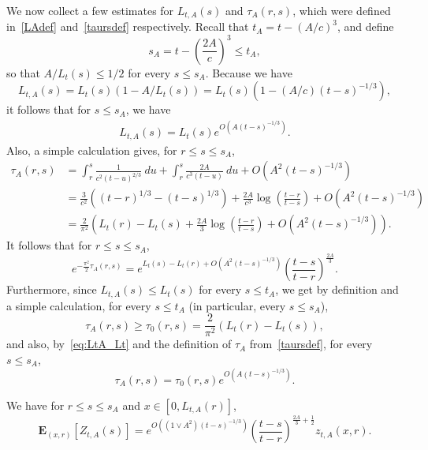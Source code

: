 \documentclass[AHL,Unicode,longabstracts,published]{cedram}
\newcommand*\E{\mathbf{E}}
\newcommand{\1} {\mathds{1}}
\begin{document}
We now collect a few estimates for $L_{t,A}(s)$ and $\tau_A(r,s)$, which were defined in~\eqref{LAdef} and~\eqref{taursdef} respectively. Recall that $t_A = t - (A/c)^3$, and define
\[
s_A = t - \left(\frac{2A}{c}\right)^3 \le t_A,
\]
so that $A/L_t(s) \le 1/2$ for every $s\le s_A$. Because we have
\[
L_{t,A}(s) = L_t(s)(1 - A/L_t(s)) = L_t(s)\left(1 - (A/c)(t - s)^{-1/3}\right),
\]
it follows that for $s\le s_A$, we have
\begin{align}\label{eq:LtA_Lt}
L_{t,A}(s) = L_t(s)e^{O\left(A(t-s)^{-1/3}\right)}.
\end{align}
Also, a simple calculation gives, for $r\le s\le s_A$,
\begin{equation}\label{tauasym}
\begin{split}
\tau_A(r, s) &= \int_r^s \frac{1}{c^2 (t - u)^{2/3}} \: du + \int_r^s \frac{2A}{c^3 (t - u)} \: du + O\left(A^2(t - s)^{-1/3}\right) \\
&= \frac{3}{c^2} \left((t - r)^{1/3} - (t - s)^{1/3} \right) + \frac{2A}{c^3} \log \left(\frac{t - r}{t-s} \right) + O\left(A^2(t - s)^{-1/3}\right)\\
&= \frac 2 {\pi^2} \left(L_t(r) - L_t(s) + \frac {2 A}{3} \log \left(\frac{t - r}{t-s} \right) + O\left(A^2(t - s)^{-1/3}\right)\right).
\end{split}
\end{equation}
It follows that for $r\le s\le s_A$,
\begin{equation}\label{tauLexpasym}
e^{-\frac{\pi^2}2\tau_A(r,s)} = e^{L_t(s) - L_t(r) + O\left(A^2(t - s)^{-1/3}\right)} \left(\frac{t - s}{t-r} \right)^{\frac{2A} 3}.
\end{equation}
Furthermore, since $L_{t,A}(s) \le L_t(s)$ for every $s\le t_A$, we get by definition and a simple calculation, for every $s\le t_A$ (in particular, every $s\le s_A$),
\begin{equation}\label{taucomparison}
\tau_A(r,s) \ge \tau_0(r,s) = \frac 2 {\pi^2} \left(L_t(r) - L_t(s)\right),
\end{equation}
and also, by~\eqref{eq:LtA_Lt} and the definition of $\tau_A$ from~\eqref{taursdef}, for every $s\le s_A$,
\begin{equation}\label{taucomparisonweak}
\tau_A(r,s) = \tau_0(r,s)e^{O\left(A(t-s)^{-1/3}\right)}.
\end{equation}

\begin{lemm}
We have for $r\le s\le s_A$ and $x\in [0,L_{t,A}(r)]$,\label{lem:Zexp}
\[
\E_{(x,r)}\left[Z_{t,A}(s)\right] = e^{O\left(\left(1 \vee A^2\right)(t - s)^{-1/3}\right)} \left(\frac{t-s}{t-r}\right)^{\frac{2A} 3 + \frac 1 2} z_{t,A}(x,r).
\]
\end{lemm}
\end{document}

